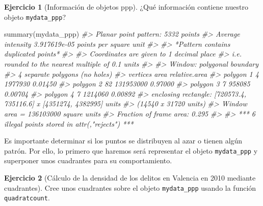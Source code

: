 \documentclass[
]{book}
\newenvironment{Shaded}{\begin{snugshade}}{\end{snugshade}}
\newcommand{\CommentTok}[1]{\textcolor[rgb]{0.56,0.35,0.01}{\textit{#1}}}
\newcommand{\FunctionTok}[1]{\textcolor[rgb]{0.00,0.00,0.00}{#1}}
\newcommand{\NormalTok}[1]{#1}
\theoremstyle{definition}
\theoremstyle{definition}
\theoremstyle{definition}
\newtheorem{exercise}{Ejercicio}[chapter]
\theoremstyle{definition}
\theoremstyle{remark}
\begin{document}
\begin{exercise}[Información de objetos ppp]
\protect\hypertarget{exr:ex31}{}\label{exr:ex31}¿Qué información contiene nuestro objeto \texttt{mydata\_ppp}?
\end{exercise}

\begin{Shaded}
\begin{Highlighting}[]
\FunctionTok{summary}\NormalTok{(mydata\_ppp)}
\CommentTok{\#\textgreater{} Planar point pattern:  5332 points}
\CommentTok{\#\textgreater{} Average intensity 3.917619e{-}05 points per square unit}
\CommentTok{\#\textgreater{} }
\CommentTok{\#\textgreater{} *Pattern contains duplicated points*}
\CommentTok{\#\textgreater{} }
\CommentTok{\#\textgreater{} Coordinates are given to 1 decimal place}
\CommentTok{\#\textgreater{} i.e. rounded to the nearest multiple of 0.1 units}
\CommentTok{\#\textgreater{} }
\CommentTok{\#\textgreater{} Window: polygonal boundary}
\CommentTok{\#\textgreater{} 4 separate polygons (no holes)}
\CommentTok{\#\textgreater{}            vertices      area relative.area}
\CommentTok{\#\textgreater{} polygon 1         4   1977930       0.01450}
\CommentTok{\#\textgreater{} polygon 2        82 131953000       0.97000}
\CommentTok{\#\textgreater{} polygon 3         7    958085       0.00704}
\CommentTok{\#\textgreater{} polygon 4         7   1214060       0.00892}
\CommentTok{\#\textgreater{} enclosing rectangle: [720573.4, 735116.6] x [4351274, 4382995] units}
\CommentTok{\#\textgreater{}                      (14540 x 31720 units)}
\CommentTok{\#\textgreater{} Window area = 136103000 square units}
\CommentTok{\#\textgreater{} Fraction of frame area: 0.295}
\CommentTok{\#\textgreater{} }
\CommentTok{\#\textgreater{} *** 6 illegal points stored in attr(,"rejects") ***}
\end{Highlighting}
\end{Shaded}

Es importante determinar si los puntos se distribuyen al azar o tienen algún
patrón. Por ello, lo primero que haremos será representar el objeto \texttt{mydata\_ppp}
y superponer unos cuadrantes para su comportamiento.

\begin{exercise}[Cálculo de la densidad de los delitos en Valencia en 2010 mediante cuadrantes]
\protect\hypertarget{exr:ex32}{}\label{exr:ex32}Cree unos cuadrantes sobre el objeto \texttt{mydata\_ppp} usando la función
\texttt{quadratcount}.
\end{exercise}
\end{document}
